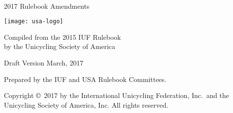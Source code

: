 \begin{titlepage}
\centering
\ \\

{\Huge 2017 Rulebook Amendments}
\vspace{5mm}

\texttt{[image: usa-logo]}

\vspace{5mm}
{\Large Compiled from the 2015 IUF Rulebook\\ }
\vspace{3mm}
{\Large by the Unicycling Society of America}

\vspace{8mm}
{\Large Draft Version \quad March, 2017}

\vspace{40mm}
Prepared by the IUF and USA Rulebook Committees.

\vspace{5mm}
{\small Copyright \copyright\ 2017 by the International Unicycling Federation, Inc.\ and the Unicycling Society of America, Inc. All rights reserved.}

\end{titlepage}
